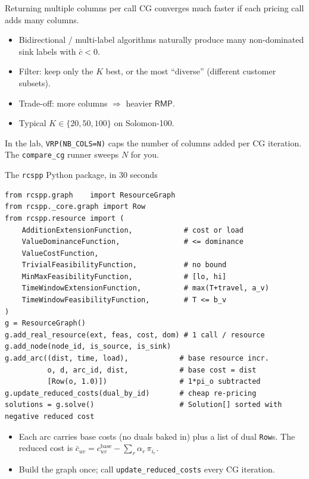 \documentclass[10pt,aspectratio=169]{beamer}
\newcommand{\rmp}{\mathsf{RMP}}
\newcommand{\redcost}{\bar{c}}
\begin{document}
\begin{frame}{Returning multiple columns per call}
  CG converges much faster if each pricing call adds many columns.

  \medskip
  \begin{itemize}\small
    \item Bidirectional / multi-label algorithms naturally produce many
          non-dominated sink labels with $\redcost<0$.
    \item Filter: keep only the $K$ best, or the most ``diverse'' (different
          customer subsets).
    \item Trade-off: more columns $\Rightarrow$ heavier $\rmp$.
    \item Typical $K\in\{20,50,100\}$ on Solomon-100.
  \end{itemize}
  \vfill
  \begin{tcolorbox}[colback=accent!5,colframe=accent!50,sharp corners,boxrule=0.4pt]
   In the lab, \texttt{VRP(NB\_COLS=N)} caps the number of columns added per
   CG iteration. The \texttt{compare\_cg} runner sweeps $N$ for you.
  \end{tcolorbox}
\end{frame}

\begin{frame}[fragile]{The \texttt{rcspp} Python package, in 30 seconds}
\begin{lstlisting}
from rcspp.graph    import ResourceGraph
from rcspp._core.graph import Row
from rcspp.resource import (
    AdditionExtensionFunction,            # cost or load
    ValueDominanceFunction,               # <= dominance
    ValueCostFunction,
    TrivialFeasibilityFunction,           # no bound
    MinMaxFeasibilityFunction,            # [lo, hi]
    TimeWindowExtensionFunction,          # max(T+travel, a_v)
    TimeWindowFeasibilityFunction,        # T <= b_v
)
g = ResourceGraph()
g.add_real_resource(ext, feas, cost, dom) # 1 call / resource
g.add_node(node_id, is_source, is_sink)
g.add_arc((dist, time, load),            # base resource incr.
          o, d, arc_id, dist,            # base cost = dist
          [Row(o, 1.0)])                 # 1*pi_o subtracted
g.update_reduced_costs(dual_by_id)       # cheap re-pricing
solutions = g.solve()                    # Solution[] sorted with negative reduced cost
\end{lstlisting}
  \begin{itemize}\small
    \item Each arc carries \alert{base costs} (no duals baked in) plus
          a list of dual \texttt{Row}s. The reduced cost is
          $\redcost_{uv}=c_{uv}^{\text{base}}-\sum_r \alpha_r\,\pi_{i_r}$.
    \item \alert{Build the graph once}; call
          \texttt{update\_reduced\_costs} every CG iteration.
  \end{itemize}
\end{frame}
\end{document}

